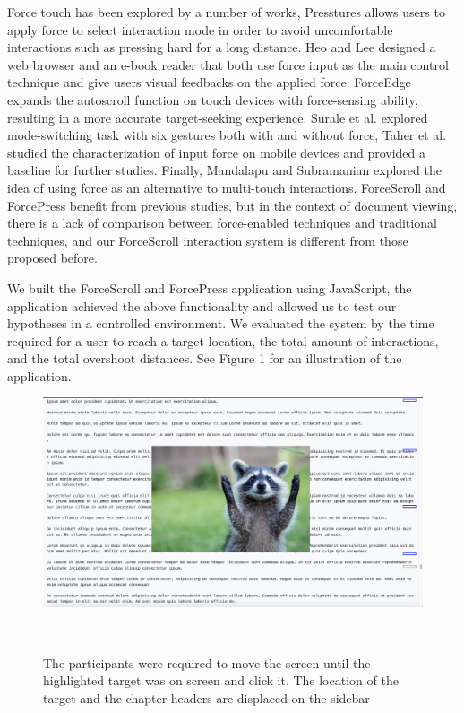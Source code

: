 \documentclass{sigchi}
\begin{document}
Force touch has been explored by a number of works, Presstures \cite{rendl2014presstures} allows users to apply force to select interaction mode in order to avoid uncomfortable interactions such as pressing hard for a long distance. Heo and Lee \cite{heo2011force} designed a web browser and an e-book reader that both use force input as the main control technique and give users visual feedbacks on the applied force. ForceEdge \cite{antoine2017forceedge} expands the autoscroll function on touch devices with force-sensing ability, resulting in a more accurate target-seeking experience. Surale et al. \cite{surale2017experimental} explored mode-switching task with six gestures both with and without force, Taher et al. \cite{taher2014empirical} studied the characterization of input force on mobile devices and provided a baseline for further studies. Finally, Mandalapu and Subramanian \cite{mandalapu2011exploring} explored the idea of using force as an alternative to multi-touch interactions. ForceScroll and ForcePress benefit from previous studies, but in the context of document viewing, there is a lack of comparison between force-enabled techniques and traditional techniques, and our ForceScroll interaction system is different from those proposed before.          


We built the ForceScroll and ForcePress application using JavaScript, the application achieved the above functionality and allowed us to test our hypotheses in a controlled environment. We evaluated the system by the time required for a user to reach a target location, the total amount of interactions, and the total overshoot distances. See Figure 1 for an illustration of the application.  




\begin{figure}[!h]
    \centering
    \includegraphics[width=0.9\columnwidth]{figures/Capture}
    \caption{The participants were required to move the screen until the highlighted target was on screen and click it. The location of the target and the chapter headers are displaced on the sidebar}~\label{fig:figure1}
\end{figure}
\end{document}
